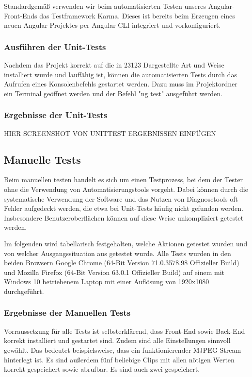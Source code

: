 Standardgemäß verwenden wir beim automatisierten Testen unseres Angular-Front-Ends das Testframework Karma. Dieses ist bereits beim Erzeugen eines neuen Angular-Projektes per Angular-\acs{CLI} integriert und vorkonfiguriert. 

\subsubsection{Ausführen der Unit-Tests}
Nachdem das Projekt korrekt auf die in 23123 Dargestellte Art und Weise installiert wurde und lauffähig ist, können die automatisierten Tests durch das Aufrufen eines Konsolenbefehls gestartet werden. Dazu muss im Projektordner ein Terminal geöffnet werden und der Befehl "ng test" ausgeführt werden.

\subsubsection{Ergebnisse der Unit-Tests}
HIER SCREENSHOT VON UNITTEST ERGEBNISSEN EINFÜGEN


\subsection{Manuelle Tests}
Beim manuellen testen handelt es sich um einen Testprozess, bei dem der Tester ohne die Verwendung von Automatisierungstools vorgeht. Dabei können durch die systematische Verwendung der Software und das Nutzen von Diagnosetools oft Fehler aufgedeckt werden, die etwa bei Unit-Tests häufig nicht gefunden werden. Insbesondere Benutzeroberflächen können auf diese Weise unkompliziert getestet werden.

Im folgenden wird tabellarisch festgehalten, welche Aktionen getestet wurden und von welcher Ausgangssituation aus getestet wurde. Alle Tests wurden in den beiden Browsern Google Chrome (64-Bit Version 71.0.3578.98 Offizieller Build) und Mozilla Firefox (64-Bit Version 63.0.1 Offizieller Build) auf einem mit Windows 10 betriebenem Laptop mit einer Auflösung von 1920x1080 durchgeführt. 

\subsubsection{Ergebnisse der Manuellen Tests}
Vorraussetzung für alle Tests ist selbsterklärend, dass Front-End sowie Back-End korrekt installiert und gestartet sind. Zudem sind alle Einstellungen sinnvoll gewählt. Das bedeutet beispielsweise, dass ein funktionierender MJPEG-Stream hinterlegt ist. Es sind außerdem fünf beliebige Clips mit allen nötigen Werten korrekt gespeichert sowie abrufbar. Es sind auch zwei gespeichert.

